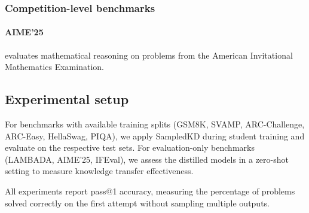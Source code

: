 \documentclass[11pt]{article}
\begin{document}
\subsubsection{Competition-level benchmarks}
\paragraph{AIME'25} evaluates mathematical reasoning on problems from the American Invitational Mathematics Examination.

\subsection{Experimental setup}

For benchmarks with available training splits (GSM8K, SVAMP, ARC-Challenge, ARC-Easy, HellaSwag, PIQA), we apply SampledKD during student training and evaluate on the respective test sets. For evaluation-only benchmarks (LAMBADA, AIME'25, IFEval), we assess the distilled models in a zero-shot setting to measure knowledge transfer effectiveness.

All experiments report pass@1 accuracy, measuring the percentage of problems solved correctly on the first attempt without sampling multiple outputs.
\end{document}
